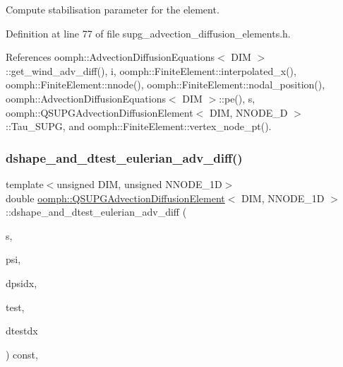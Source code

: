 Compute stabilisation parameter for the element. 



Definition at line 77 of file supg\+\_\+advection\+\_\+diffusion\+\_\+elements.\+h.



References oomph\+::\+Advection\+Diffusion\+Equations$<$ D\+I\+M $>$\+::get\+\_\+wind\+\_\+adv\+\_\+diff(), i, oomph\+::\+Finite\+Element\+::interpolated\+\_\+x(), oomph\+::\+Finite\+Element\+::nnode(), oomph\+::\+Finite\+Element\+::nodal\+\_\+position(), oomph\+::\+Advection\+Diffusion\+Equations$<$ D\+I\+M $>$\+::pe(), s, oomph\+::\+Q\+S\+U\+P\+G\+Advection\+Diffusion\+Element$<$ D\+I\+M, N\+N\+O\+D\+E\+\_\+D $>$\+::\+Tau\+\_\+\+S\+U\+PG, and oomph\+::\+Finite\+Element\+::vertex\+\_\+node\+\_\+pt().

\mbox{\label{classoomph_1_1QSUPGAdvectionDiffusionElement_a07f5aafc7171048c0237574bf74ab265}} 
\subsubsection{\texorpdfstring{dshape\+\_\+and\+\_\+dtest\+\_\+eulerian\+\_\+adv\+\_\+diff()}{dshape\_and\_dtest\_eulerian\_adv\_diff()}}
{\footnotesize\ttfamily template$<$unsigned D\+IM, unsigned N\+N\+O\+D\+E\+\_\+1D$>$ \\
double \hyperlink{classoomph_1_1QSUPGAdvectionDiffusionElement}{oomph\+::\+Q\+S\+U\+P\+G\+Advection\+Diffusion\+Element}$<$ D\+IM, N\+N\+O\+D\+E\+\_\+1D $>$\+::dshape\+\_\+and\+\_\+dtest\+\_\+eulerian\+\_\+adv\+\_\+diff (\begin{DoxyParamCaption}\item[{const \hyperlink{classoomph_1_1Vector}{Vector}$<$ double $>$ \&}]{s,  }\item[{\hyperlink{classoomph_1_1Shape}{Shape} \&}]{psi,  }\item[{\hyperlink{classoomph_1_1DShape}{D\+Shape} \&}]{dpsidx,  }\item[{\hyperlink{classoomph_1_1Shape}{Shape} \&}]{test,  }\item[{\hyperlink{classoomph_1_1DShape}{D\+Shape} \&}]{dtestdx }\end{DoxyParamCaption}) const\hspace{0.3cm}{\ttfamily [protected]}, {\ttfamily [virtual]}}




